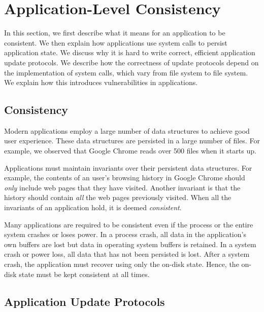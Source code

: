 \section{Application-Level Consistency}
In this section, we first describe what it means for an application to be
consistent. We then explain how applications use system calls to persist
application state. We discuss why it is hard to write correct, efficient
application update protocols. We describe how the correctness of update
protocols depend on the implementation of system calls, which vary from file
system to file system. We explain how this introduces vulnerabilities in
applications.


\subsection{Consistency}
\label{sec-invariants}
Modern applications employ a large number of data structures to achieve good
user experience. These data structures are persisted in a large number of
files. For example, we observed that Google Chrome reads over 500 files when it
starts up.

Applications must maintain invariants over their persistent data structures.
For example, the contents of an user's browsing history in Google Chrome should
\textit{only} include web pages that they have visited. Another invariant is
that the history should contain \textit{all} the web pages previously visited.
When all the invariants of an application hold, it is deemed
\textit{consistent}. 

Many applications are required to be consistent even if the process or the
entire system crashes or loses power. In a process crash, all data in the
application's own buffers are lost but data in operating system buffers is
retained. In a system crash or power loss, all data that has not been persisted
is lost. After a system crash, the application must recover using only the
on-disk state. Hence, the on-disk state must be kept consistent at all times. 

\subsection{Application Update Protocols}


